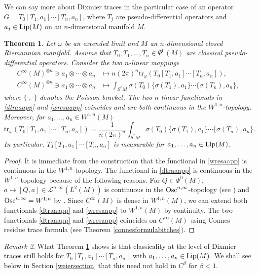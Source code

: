 \documentclass[10pt]{amsart}
\newtheorem{thm}{Theorem}[section]
\theoremstyle{remark}
\newtheorem{remark}[thm]{Remark}
\theoremstyle{definition}
\begin{document}
We can say more about Dixmier traces in the particular case of an operator $G=T_0[T_1,a_1]\cdots [T_n,a_n]$, where $T_j$ are pseudo-differential operators and $a_j\in {\textnormal{Lip}}(M)$ on an $n$-dimensional manifold $M$.

\begin{thm}
\label{ctfforlip}
Let $\omega$ be an extended limit and $M$ an $n$-dimensional closed Riemannian manifold. Assume that $T_0,T_1,\ldots, T_n\in \Psi^0(M)$ are classical pseudo-differential operators. Consider the two $n$-linear mappings 
\begin{align}
\label{dtraaapp}
C^\infty(M)^{\otimes n}\ni a_1\otimes \cdots \otimes a_n&\mapsto n(2\pi)^n{\mathrm{t}\mathrm{r}}_\omega(T_0[T_1,a_1]\cdots [T_n,a_n]),\\
\label{wresaapp}
C^\infty(M)^{\otimes n}\ni a_1\otimes \cdots \otimes a_n&\mapsto \int_{S^*M} \sigma(T_0)\{\sigma(T_1),a_1\}\cdots \{\sigma(T_n),a_n\},
\end{align}
where $\{\cdot,\cdot\}$ denotes the Poisson bracket. The two $n$-linear functionals in \eqref{dtraaapp} and \eqref{wresaapp} coincides and are both continuous in the $W^{1,n}$-topology. Moreover, for $a_1,\ldots, a_n\in W^{1,n}(M)$
$${\mathrm{t}\mathrm{r}}_\omega(T_0[T_1,a_1]\cdots [T_n,a_n])= \frac{1}{n(2\pi)^n}\int_{S^*M} \sigma(T_0)\{\sigma(T_1),a_1\}\cdots \{\sigma(T_n),a_n\}.$$
In particular, $T_0[T_1,a_1]\cdots [T_n,a_n]$ is measurable for $a_1,\ldots, a_n\in {\textnormal{Lip}}(M)$.
\end{thm}

\begin{proof}
It is immediate from the construction that the functional in \eqref{wresaapp} is continuous in the $W^{1,n}$-topology. The functional in \eqref{dtraaapp} is continuous in the $W^{1,n}$-topology because of the following reasons. For $Q\in \Psi^0(M)$, $a\mapsto [Q,a]\in \mathcal{L}^{n,\infty}(L^2(M))$ is continuous in the $\textnormal{Osc}^{n,\infty}$-topology (see \cite{rochbergsemmes}) and $\textnormal{Osc}^{n,\infty}=W^{1,n}$ by \cite[Appendix]{connessulltele}. Since $C^\infty(M)$ is dense in $W^{1,n}(M)$, we can extend both functionals  \eqref{dtraaapp} and \eqref{wresaapp} to $W^{1,n}(M)$ by continuity. The two functionals  \eqref{dtraaapp} and \eqref{wresaapp} coincides on $C^\infty(M)$ using Connes residue trace formula (see Theorem \ref{connesformulabitches}).
\end{proof}

\begin{remark}
What Theorem \ref{ctfforlip} shows is that classicality at the level of Dixmier traces still holds for $T_0[T_1,a_1]\cdots [T_n,a_n]$ with $a_1,\ldots, a_n\in {\textnormal{Lip}}(M)$. We shall see below in Section \ref{weiersection} that this need not hold in $C^\beta$ for $\beta<1$.
\end{remark}
\end{document}
